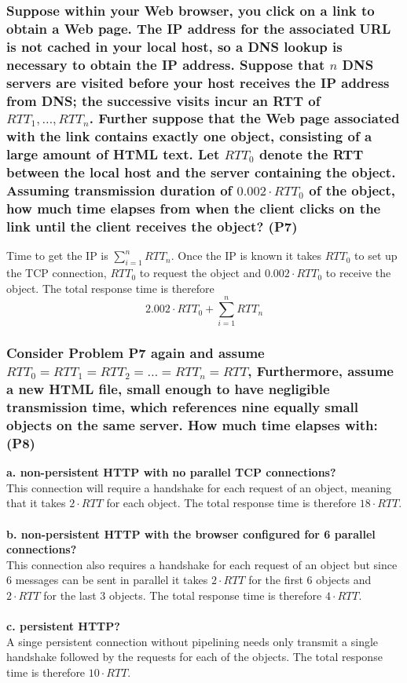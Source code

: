 \subsubsection{Suppose within your Web browser, you click on a link to obtain a Web page. The IP address for the associated URL is not cached in your local host, so a DNS lookup is necessary to obtain the IP address. Suppose that $n$ DNS servers are visited before your host receives the IP address from DNS; the successive visits incur an RTT of $RTT_1, \dots , RTT_n$. Further suppose that the Web page associated with the link contains exactly one object, consisting of a large amount of HTML text. Let $RTT_0$ denote the RTT between the local host and the server containing the object. Assuming transmission duration of $0.002 \cdot RTT_0$ of the object, how much time elapses from when the client clicks on the link until the client receives the object? (P7)}
Time to get the IP is $\sum_{i = 1}^{n} RTT_n$. Once the IP is known it takes $RTT_0$ to set up the TCP connection, $RTT_0$ to request the object and $0.002 \cdot RTT_0$ to receive the object. The total response time is therefore
\begin{equation*}
    2.002 \cdot RTT_0 + \sum_{i = 1}^{n} RTT_n
\end{equation*}

\subsubsection{Consider Problem P7 again and assume $RTT_0 = RTT_1 = RTT_2 = \dots = RTT_n = RTT$, Furthermore, assume a new HTML file, small enough to have negligible transmission time, which references nine equally small objects on the same server. How much time elapses with: (P8)}

\textbf{a. non-persistent HTTP with no parallel TCP connections?} \\
This connection will require a handshake for each request of an object, meaning that it takes $2 \cdot RTT$ for each object. The total response time is therefore $18 \cdot RTT$. \\
\\
\textbf{b. non-persistent HTTP with the browser configured for 6 parallel connections?} \\
This connection also requires a handshake for each request of an object but since 6 messages can be sent in parallel it takes $2 \cdot RTT$ for the first 6 objects and $2 \cdot RTT$ for the last 3 objects. The total response time is therefore $4 \cdot RTT$. \\
\\
\textbf{c. persistent HTTP?} \\
A singe persistent connection without pipelining needs only transmit a single handshake followed by the requests for each of the objects. The total response time is therefore $10 \cdot RTT$.


